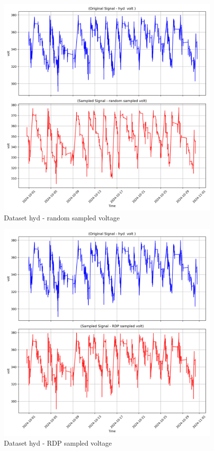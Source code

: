\begin{figure}
    \centering
    \includegraphics[width=1\linewidth]{screenshots/hyd/random_sampled_volt_screenshot.png}
    \caption{Dataset hyd - random sampled voltage }
    \label{fig:hyd_random_sampled_volt_screenshot}
\end{figure}
\begin{figure}
    \centering
    \includegraphics[width=1\linewidth]{screenshots/hyd/RDP_sampled_volt_screenshot.png}
    \caption{Dataset hyd - RDP sampled voltage }
    \label{fig:hyd_RDP_sampled_volt_screenshot}
\end{figure}
